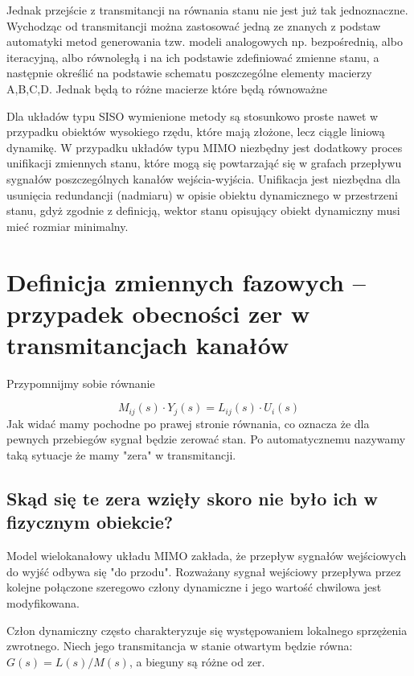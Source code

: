 \documentclass{article}
\begin{document}
		Jednak przejście z transmitancji na równania stanu nie jest już tak jednoznaczne.
		Wychodząc od transmitancji można zastosować jedną ze znanych z podstaw
		automatyki metod generowania tzw. modeli analogowych
		np. bezpośrednią, albo iteracyjną, albo równoległą i na ich podstawie
		zdefiniować zmienne stanu, a następnie określić na podstawie schematu poszczególne
		elementy macierzy A,B,C,D.
		Jednak będą to różne macierze które będą równoważne

		Dla układów typu SISO wymienione metody są stosunkowo proste nawet w przypadku
		obiektów wysokiego rzędu, które mają złożone, lecz ciągle liniową dynamikę.
		W przypadku układów typu MIMO niezbędny jest dodatkowy proces unifikacji
		zmiennych stanu, które mogą się powtarzająć się w grafach przepływu sygnałów
		poszczególnych kanałów wejścia-wyjścia. Unifikacja jest niezbędna dla usunięcia
		redundancji (nadmiaru) w opisie obiektu dynamicznego w przestrzeni stanu, gdyż
		zgodnie z definicją, wektor stanu opisujący obiekt dynamiczny musi
		mieć rozmiar minimalny.

	\section{Definicja zmiennych fazowych – przypadek obecności zer w transmitancjach kanałów}

	Przypomnijmy sobie równanie

	\begin{equation}
		 M_{ij}(s) \cdot Y_{j}(s) = L_{ij}(s) \cdot U_{i}(s) 
	\end{equation}
	Jak widać mamy pochodne po prawej stronie równania, co oznacza że dla pewnych
	przebiegów sygnał będzie zerować stan.
	Po automatycznemu nazywamy taką sytuacje że mamy "zera" w transmitancji.

	\subsection{Skąd się te zera wzięły skoro nie było ich w fizycznym obiekcie?}

	Model wielokanałowy układu MIMO zakłada, że przepływ sygnałów wejściowych do wyjść
	odbywa się "do przodu". Rozważany sygnał wejściowy przepływa przez
	kolejne połączone szeregowo człony dynamiczne i jego wartość chwilowa jest
	modyfikowana.

	Człon dynamiczny często charakteryzuje się występowaniem lokalnego
	sprzężenia zwrotnego. Niech jego transmitancja w stanie otwartym będzie równa:
	$G(s) = L(s)/M(s)$, a bieguny są różne od zer.
\end{document}
